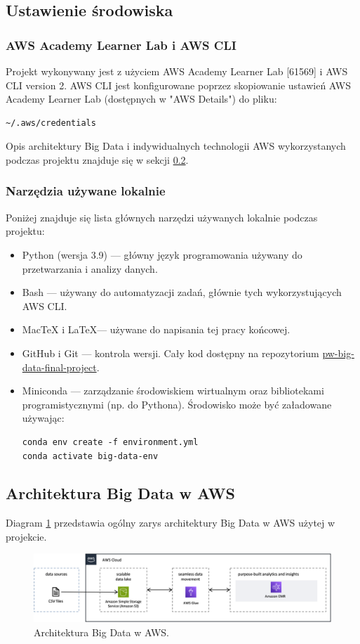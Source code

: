 \documentclass[12pt, a4paper]{article}
\begin{document}
\subsection{Ustawienie środowiska}
\subsubsection{AWS Academy Learner Lab i AWS CLI}
Projekt wykonywany jest z użyciem AWS Academy Learner Lab [61569] i AWS CLI version 2. AWS CLI jest konfigurowane poprzez skopiowanie ustawień AWS Academy Learner Lab (dostępnych w "AWS Details") do  pliku:
\begin{verbatim}
~/.aws/credentials
\end{verbatim}

Opis architektury Big Data i indywidualnych technologii AWS wykorzystanych podczas projektu znajduje się w sekcji \ref{sec:aws_architecture}.

\subsubsection{Narzędzia używane lokalnie}
Poniżej znajduje się lista głównych narzędzi używanych lokalnie podczas projektu:
\begin{itemize}
    \item Python (wersja 3.9) --- główny język programowania używany do przetwarzania i analizy danych.
    \item Bash --- używany do automatyzacji zadań, głównie tych wykorzystujących AWS CLI.
    \item MacTeX i \LaTeX --- używane do napisania tej pracy końcowej.
    \item GitHub i Git --- kontrola wersji. Cały kod dostępny na repozytorium \href{https://github.com/safurynp/pw-big-data-final-project}{pw-big-data-final-project}.
    \item Miniconda --- zarządzanie środowiskiem wirtualnym oraz bibliotekami programistycznymi (np. do Pythona). Środowisko może być załadowane używając:
\begin{verbatim}
conda env create -f environment.yml
conda activate big-data-env
\end{verbatim}

\end{itemize}

\subsection{Architektura Big Data w AWS} \label{sec:aws_architecture}
Diagram \ref{fig:aws_architecture} przedstawia ogólny zarys architektury Big Data w AWS użytej w projekcie.
\begin{figure}[h]
    \includegraphics[width=\textwidth]{figures/aws_architecture.png}
    \caption{Architektura Big Data w AWS.}
    \label{fig:aws_architecture}
\end{figure}
\end{document}

